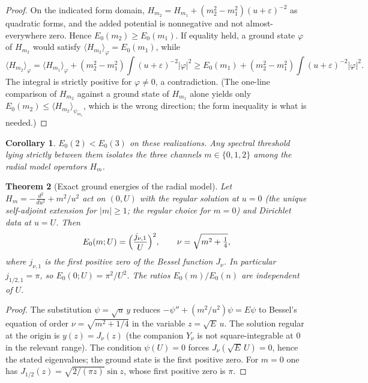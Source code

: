 \documentclass[11pt,a4paper]{article}
\newtheorem{theorem}{Theorem}
\newtheorem{corollary}[theorem]{Corollary}
\theoremstyle{definition}
\theoremstyle{remark}
\begin{document}
\begin{proof}
On the indicated form domain,
$H_{m_2}=H_{m_1}+(m_2^2-m_1^2)(u+\varepsilon)^{-2}$
as quadratic forms, and the added potential is nonnegative and not
almost-everywhere zero. Hence $E_0(m_2)\ge E_0(m_1)$. If equality held,
a ground state $\varphi$ of $H_{m_2}$ would satisfy
$\langle H_{m_2}\rangle_\varphi=E_0(m_1)$, while
\[
  \langle H_{m_2}\rangle_\varphi
  =\langle H_{m_1}\rangle_\varphi+(m_2^2-m_1^2)\int(u+\varepsilon)^{-2}|\varphi|^2
  \ge E_0(m_1)+(m_2^2-m_1^2)\int(u+\varepsilon)^{-2}|\varphi|^2.
\]
The integral is strictly positive for $\varphi\not=0$, a contradiction.
(The one-line comparison of $H_{m_2}$ against a ground state of $H_{m_1}$
alone yields only $E_0(m_2)\le\langle H_{m_2}\rangle_{\psi_{m_1}}$, which
is the wrong direction; the form inequality is what is needed.)
\end{proof}

\begin{corollary}
\label{cor:e2e3}
$E_0(2)<E_0(3)$ on these realizations. Any spectral threshold lying
strictly between them isolates the three channels $m\in\{0,1,2\}$ among
the radial model operators $H_m$.
\end{corollary}

\begin{theorem}[Exact ground energies of the radial model]
\label{thm:E0exact}
Let $H_m=-\frac{d^2}{du^2}+m^2/u^2$ act on $(0,U)$ with the regular
solution at $u=0$ (the unique self-adjoint extension for
$\lvert m\rvert\ge 1$; the regular choice for $m=0$) and Dirichlet
data at $u=U$. Then
\[
  E_0(m;U)=\Bigl(\frac{j_{\nu,1}}{U}\Bigr)^2,
  \qquad \nu=\sqrt{m^2+\tfrac14},
\]
where $j_{\nu,1}$ is the first positive zero of the Bessel function
$J_\nu$. In particular $j_{1/2,1}=\pi$, so $E_0(0;U)=\pi^2/U^2$.
The ratios $E_0(m)/E_0(n)$ are independent of $U$.
\end{theorem}

\begin{proof}
The substitution $\psi=\sqrt{u}\,y$ reduces $-\psi''+(m^2/u^2)\psi=E\psi$
to Bessel's equation of order $\nu=\sqrt{m^2+1/4}$ in the variable
$z=\sqrt{E}\,u$. The solution regular at the origin is $y(z)=J_\nu(z)$
(the companion $Y_\nu$ is not square-integrable at $0$ in the relevant
range). The condition $\psi(U)=0$ forces $J_\nu(\sqrt{E}\,U)=0$, hence
the stated eigenvalues; the ground state is the first positive zero.
For $m=0$ one has $J_{1/2}(z)=\sqrt{2/(\pi z)}\sin z$, whose first
positive zero is $\pi$.
\end{proof}
\end{document}
